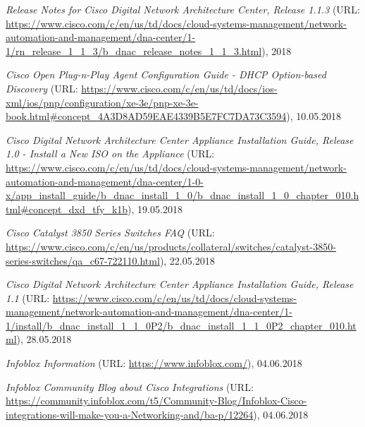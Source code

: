 \begin{thebibliography}{}
	 \textit{Release Notes for Cisco Digital Network Architecture Center, Release 1.1.3} (URL: \url{https://www.cisco.com/c/en/us/td/docs/cloud-systems-management/network-automation-and-management/dna-center/1-1/rn_release_1_1_3/b_dnac_release_notes_1_1_3.html}), 2018
	
	 \textit{Cisco Open Plug-n-Play Agent Configuration Guide - DHCP Option-based Discovery} (URL: \url{https://www.cisco.com/c/en/us/td/docs/ios-xml/ios/pnp/configuration/xe-3e/pnp-xe-3e-book.html#concept_4A3D8AD59EAE4339B5E7FC7DA73C3594}), 10.05.2018
	
	 \textit{Cisco Digital Network Architecture Center Appliance Installation Guide, Release 1.0 - Install a New ISO on the Appliance
	} (URL: \url{https://www.cisco.com/c/en/us/td/docs/cloud-systems-management/network-automation-and-management/dna-center/1-0-x/app_install_guide/b_dnac_install_1_0/b_dnac_install_1_0_chapter_010.html#concept_dxd_tfy_k1b}), 19.05.2018

	 \textit{Cisco Catalyst 3850 Series Switches FAQ} (URL: \url{https://www.cisco.com/c/en/us/products/collateral/switches/catalyst-3850-series-switches/qa_c67-722110.html}), 22.05.2018	

	 \textit{Cisco Digital Network Architecture Center Appliance Installation Guide, Release 1.1} (URL: \url{https://www.cisco.com/c/en/us/td/docs/cloud-systems-management/network-automation-and-management/dna-center/1-1/install/b_dnac_install_1_1_0P2/b_dnac_install_1_1_0P2_chapter_010.html}), 28.05.2018
	
	 \textit{Infoblox Information} (URL: \url{https://www.infoblox.com/}), 04.06.2018
	
	 \textit{Infoblox Community Blog about Cisco Integrations} (URL: \url{https://community.infoblox.com/t5/Community-Blog/Infoblox-Cisco-integrations-will-make-you-a-Networking-and/ba-p/12264}), 04.06.2018
	
\end{thebibliography}
